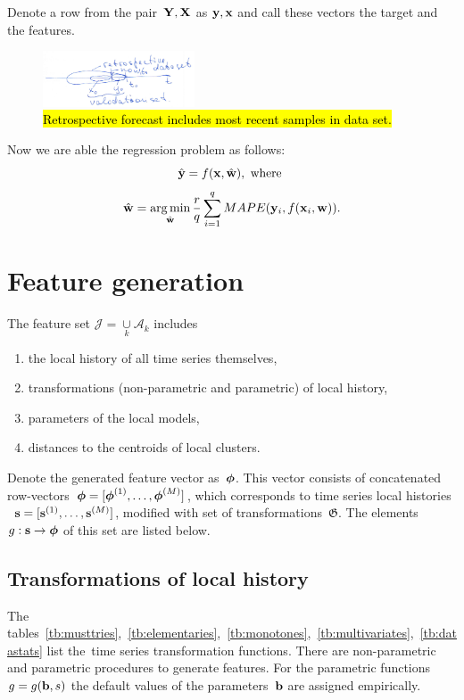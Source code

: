 \documentclass[conference]{IEEEtran}
\begin{document}
Denote a row from the pair~$\mathbf{Y},{\mathbf{X}}$ as ${\mathbf{y}},{\mathbf{x}}$ and call these vectors the target and the features.

\begin{figure}[!ht]
\centering\includegraphics[width=0.4\textwidth]{retrospective_validation.png}
\caption{\hl{Retrospective forecast includes most recent samples in data set.}\label{fg:retrospective}}
\end{figure}

Now we are able the regression problem as follows:
\begin{equation*}
\hat{{\mathbf{y}}} = f({\mathbf{x}}, \hat{{\mathbf{w}}}), \text{~where~}
\end{equation*}
\[ \hat{{\mathbf{w}}} = \mathop{\arg\min}_{\hat{{\mathbf{w}}}}\frac{r}{q}\sum_{i=1}^{q} MAPE({\mathbf{y}}_i, f({\mathbf{x}}_i, {\mathbf{w}})).\]

\section{Feature generation}
The feature set $\mathcal{J} = \mathop{\cup}\limits_k \mathcal{A}_k$ includes
\begin{enumerate}[1)]
\item the local history of all time series themselves,
\item transformations (non-parametric and parametric) of local history,
\item parameters of the local models,
\item distances to the centroids of local clusters.
\end{enumerate}


Denote the generated feature vector as~${\boldsymbol{\phi}}$. This vector consists of concatenated row-vectors~${\boldsymbol{\phi}}=[{\boldsymbol{\phi}}^{(1)},\dots,{\boldsymbol{\phi}}^{(M)}]$, which corresponds to time series local histories ~${\mathbf{s}}=[{\mathbf{s}}^{(1)},\dots,{\mathbf{s}}^{(M)}]$, modified with set of transformations~$\mathfrak{G}$. The elements~$g:{\mathbf{s}}\to{\boldsymbol{\phi}}$ of this set are listed below.

\subsection{Transformations of local history}
The tables~\ref{tb:musttries},~\ref{tb:elementaries},~\ref{tb:monotones},~\ref{tb:multivariates},~\ref{tb:datastats} list the~time series transformation functions. There are non-parametric and parametric procedures to generate features. For the parametric functions~$g=g({\mathbf{b}},s)$ the default values of the parameters~${\mathbf{b}}$ are assigned empirically.
\end{document}
